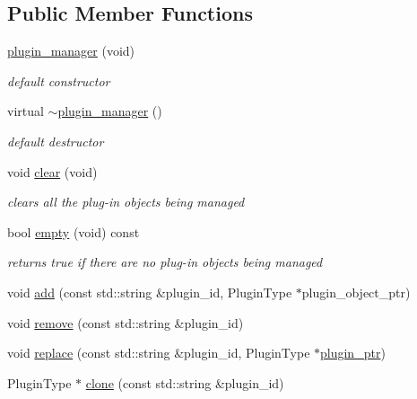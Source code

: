 \subsection*{Public Member Functions}
\begin{DoxyCompactItemize}
\item 
\hyperlink{classpion_1_1plugin__manager_a6f451cdb1f4ea91b954e5dd453a827d3}{plugin\-\_\-manager} (void)
\begin{DoxyCompactList}\small\item\em default constructor \end{DoxyCompactList}\item 
virtual \hyperlink{classpion_1_1plugin__manager_aff2f27834dee6eb0087e68f2af86b9e9}{$\sim$plugin\-\_\-manager} ()
\begin{DoxyCompactList}\small\item\em default destructor \end{DoxyCompactList}\item 
void \hyperlink{classpion_1_1plugin__manager_ac56a5e432352d1b9c2a4853ce82a5a8c}{clear} (void)
\begin{DoxyCompactList}\small\item\em clears all the plug-\/in objects being managed \end{DoxyCompactList}\item 
bool \hyperlink{classpion_1_1plugin__manager_adee5498ef23acb797355b2a79f3fd059}{empty} (void) const 
\begin{DoxyCompactList}\small\item\em returns true if there are no plug-\/in objects being managed \end{DoxyCompactList}\item 
void \hyperlink{classpion_1_1plugin__manager_ad017fef715f7b049513eb176e1df809b}{add} (const std\-::string \&plugin\-\_\-id, Plugin\-Type $\ast$plugin\-\_\-object\-\_\-ptr)
\item 
void \hyperlink{classpion_1_1plugin__manager_a2acdd8496472871d8ab881637577240d}{remove} (const std\-::string \&plugin\-\_\-id)
\item 
void \hyperlink{classpion_1_1plugin__manager_ab8d0b6ecfa27e23495a64d94147c4d60}{replace} (const std\-::string \&plugin\-\_\-id, Plugin\-Type $\ast$\hyperlink{classpion_1_1plugin__ptr}{plugin\-\_\-ptr})
\item 
Plugin\-Type $\ast$ \hyperlink{classpion_1_1plugin__manager_abb39b6639117e8a3f557a628fa302c44}{clone} (const std\-::string \&plugin\-\_\-id)
\item 

\end{DoxyCompactItemize}
